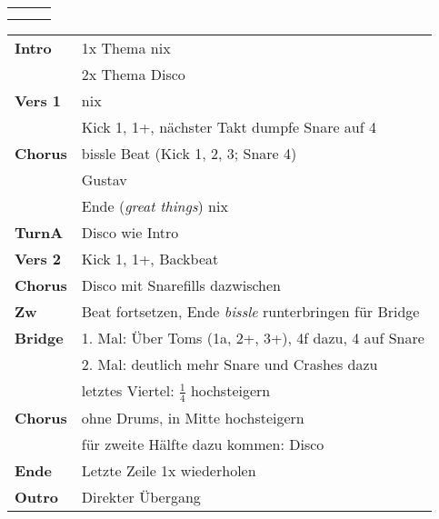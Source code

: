 

\begin{tabular}{p{0.6cm}p{12cm}p{1.4cm}}
	\rowcolor{cyan} \myRow{\thesongnumber} & \myRow{Great Things} & \myRow{102} \\
	                                       &                      &             \\
\end{tabular}

\begin{tabular}{p{1.6cm}l}
	\textbf{Intro}  & 1x Thema nix                                                   \\
	                & 2x Thema Disco                                                 \\
	\textbf{Vers 1} & nix                                                            \\
	                & Kick 1, 1+, nächster Takt dumpfe Snare auf 4                   \\
	\textbf{Chorus} & bissle Beat (Kick 1, 2, 3; Snare 4)                            \\
	                & Gustav                                                         \\
	                & Ende (\textit{great things}) nix                               \\
	\textbf{TurnA}  & Disco wie Intro                                                \\
	\textbf{Vers 2} & Kick 1, 1+, Backbeat                                           \\
	\textbf{Chorus} & Disco mit Snarefills dazwischen                                \\
	\textbf{Zw}     & Beat fortsetzen, Ende \textit{bissle} runterbringen für Bridge \\
	\textbf{Bridge} & 1. Mal: Über Toms (1a, 2+, 3+), 4f dazu, 4 auf Snare           \\
	                & 2. Mal: deutlich mehr Snare und Crashes dazu                   \\
	                & letztes Viertel: $\frac{1}{4}$ hochsteigern                    \\
	\textbf{Chorus} & ohne Drums, in Mitte hochsteigern                              \\
	                & für zweite Hälfte dazu kommen: Disco                           \\
	\textbf{Ende}   & Letzte Zeile 1x wiederholen                                    \\
	\textbf{Outro}  & Direkter Übergang                                              \\
\end{tabular}
